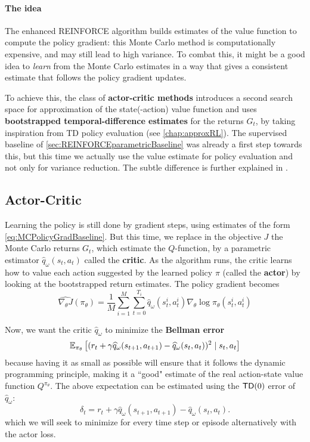 \documentclass[../course-notes.tex]{subfiles}
\begin{document}
\paragraph{The idea} The enhanced REINFORCE algorithm builds estimates of the value function to compute the policy gradient: this Monte Carlo method is computationally expensive, and may still lead to high variance. To combat this, it might be a good idea to \textit{learn} from the Monte Carlo estimates in a way that gives a consistent estimate that follows the policy gradient updates.

To achieve this, the class of \textbf{\bluefont actor-critic methods} introduces a second search space for approximation of the state(-action) value function and uses \textbf{bootstrapped temporal-difference estimates} for the returns $G_t$, by taking inspiration from TD policy evaluation (see \cref{chap:approxRL}). The supervised baseline of \cref{sec:REINFORCEparametricBaseline} was already a first step towards this, but this time we actually use the value estimate for policy evaluation and not only for variance reduction. The subtle difference is further explained in \cite[chap.\ 13.5]{Sutton1998}.

\subsection{Actor-Critic}


Learning the policy is still done by gradient steps, using estimates of the form \cref{eq:MCPolicyGradBaseline}. But this time, we replace in the objective $J$ the Monte Carlo returns $G_t$, which estimate the $Q$-function, by a parametric estimator $\widehat{q}_\omega(s_t, a_t)$ called the \textbf{\bluefont critic}. As the algorithm runs, the critic learns how to value each action suggested by the learned policy $\pi$ (called the \textbf{\bluefont actor}) by looking at the bootstrapped return estimates. The policy gradient becomes
\begin{equation}\label{eq:ActorPolicyGrad}
\widehat{\nabla_\theta J}(\pi_\theta) =
\frac{1}{M}\sum_{i=1}^M
\sum_{t=0}^{T_i} \widehat{q}_\omega(s^i_t,a^i_t)
\nabla_\theta \log\pi_\theta(s^i_t, a^i_t)
\end{equation}

Now, we want the critic $\widehat{q}_\omega$ to minimize the \textbf{Bellman error}
\[
\operatorname{\mathbb{E}}_{\pi_\theta}\left[
(r_t + \gamma\widehat{q}_\omega(s_{t+1}, a_{t+1}) - \widehat{q}_\omega(s_t,a_t))^2
\mid s_t, a_t
\right]
\]
because having it as small as possible will ensure that it follows the dynamic programming principle, making it a ``good" estimate of the real action-state value function $Q^{\pi_\theta}$. The above expectation can be estimated using the $\mathsf{TD}(0)$ error of $\widehat{q}_\omega$:
\[
\delta_t = r_t + \gamma\widehat{q}_\omega(s_{t+1}, a_{t+1}) - \widehat{q}_\omega(s_t,a_t).
\]
which we will seek to minimize for every time step or episode alternatively with the actor loss.
\end{document}
